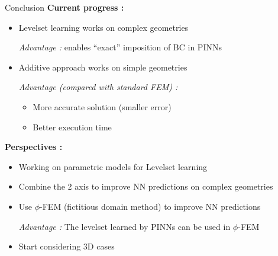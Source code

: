 \begin{frame}[label={lastslide}]{Conclusion}
	\textbf{Current progress :}
	\begin{itemize}[]
		\item Levelset learning works on complex geometries
		
		\textit{Advantage :} enables “exact” imposition of BC in PINNs
		
		\item Additive approach works on simple geometries
		
		\textit{Advantage (compared with standard FEM) :}
		\begin{itemize}[-]
			\item More accurate solution (smaller error) 
			\item Better execution time
		\end{itemize}
	\end{itemize}
	
	\textbf{Perspectives :}
	\begin{itemize}[]
		\item Working on parametric models for Levelset learning
		\item Combine the 2 axis to improve NN predictions on complex geometries 
		\item Use $\phi$-FEM (fictitious domain method) to improve NN predictions
		
		\textit{Advantage :} The levelset learned by PINNs can be used in $\phi$-FEM
		\item Start considering 3D cases
	\end{itemize}
\end{frame}

